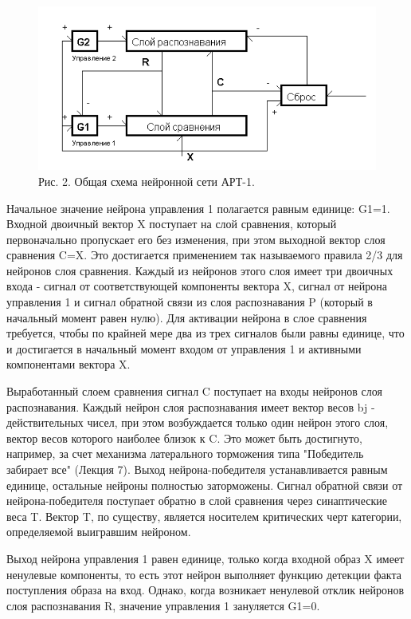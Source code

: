 \documentclass[12pt,a4paper,article]{article}
\begin{document}
\begin{figure}[h!]
	\centering
	\includegraphics[scale = 1.10]{images/2.png}
	\caption{Рис. 2. Общая схема нейронной сети АРТ-1.}
	\label{image:1}
\end{figure}	



Начальное значение нейрона управления 1 полагается равным единице: G1=1. Входной двоичный вектор X поступает на слой сравнения, который первоначально пропускает его без изменения, при этом выходной вектор слоя сравнения C=X. Это достигается применением так называемого правила 2/3 для нейронов слоя сравнения. Каждый из нейронов этого слоя имеет три двоичных входа - сигнал от соответствующей компоненты вектора X, сигнал от нейрона управления 1 и сигнал обратной связи из слоя распознавания P (который в начальный момент равен нулю). Для активации нейрона в слое сравнения требуется, чтобы по крайней мере два из трех сигналов были равны единице, что и достигается в начальный момент входом от управления 1 и активными компонентами вектора X.

Выработанный слоем сравнения сигнал C поступает на входы нейронов слоя распознавания. Каждый нейрон слоя распознавания имеет вектор весов bj - действительных чисел, при этом возбуждается только один нейрон этого слоя, вектор весов которого наиболее близок к C. Это может быть достигнуто, например, за счет механизма латерального торможения типа "Победитель забирает все" (Лекция 7). Выход нейрона-победителя устанавливается равным единице, остальные нейроны полностью заторможены. Сигнал обратной связи от нейрона-победителя поступает обратно в слой сравнения через синаптические веса T. Вектор T, по существу, является носителем критических черт категории, определяемой выигравшим нейроном.

Выход нейрона управления 1 равен единице, только когда входной образ X имеет ненулевые компоненты, то есть этот нейрон выполняет функцию детекции факта поступления образа на вход. Однако, когда возникает ненулевой отклик нейронов слоя распознавания R, значение управления 1 зануляется G1=0.
\end{document}
